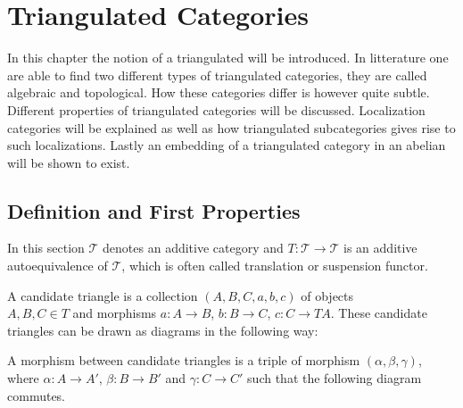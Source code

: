 \chapter{Triangulated Categories}

In this chapter the notion of a triangulated will be introduced. In litterature one are able to find two different types of triangulated categories, they are called algebraic and topological. How these categories differ is however quite subtle. Different properties of triangulated categories will be discussed. Localization categories will be explained as well as how triangulated subcategories gives rise to such localizations. Lastly an embedding of a triangulated category in an abelian will be shown to exist.

\section{Definition and First Properties}

    In this section $\mathcal{T}$ denotes an additive category and $T:\mathcal{T}\rightarrow\mathcal{T}$ is an additive autoequivalence of $\mathcal{T}$, which is often called translation or suspension functor.
    \begin{definition}
        A candidate triangle is a collection $(A,B,C,a,b,c)$ of objects \\ $A,B,C\in T$ and morphisms $a:A\rightarrow B$, $b:B\rightarrow C$, $c:C\rightarrow TA$. These candidate triangles can be drawn as diagrams in the following way:

        \begin{center}
        \end{center}

        A morphism between candidate triangles is a triple of morphism $(\alpha, \beta, \gamma)$, where $\alpha : A \rightarrow A'$, $\beta : B \rightarrow B'$ and $\gamma : C \rightarrow C'$ such that the following diagram commutes.

    \begin{center}
    \end{center}

    \end{definition}

